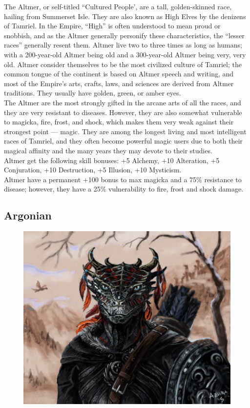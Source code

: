 \documentclass[12pt]{book}
\begin{document}
The Altmer, or self-titled ``Cultured People', are a tall, golden-skinned race, hailing from Summerset Isle. They are also known as High Elves by the denizens of Tamriel. In the Empire, ``High'' is often understood to mean proud or snobbish, and as the Altmer generally personify these characteristics, the ``lesser races'' generally resent them. Altmer live two to three times as long as humans; with a 200-year-old Altmer being old and a 300-year-old Altmer being very, very old. Altmer consider themselves to be the most civilized culture of Tamriel; the common tongue of the continent is based on Altmer speech and writing, and most of the Empire's arts, crafts, laws, and sciences are derived from Altmer traditions. They usually have golden, green, or amber eyes.\\

The Altmer are the most strongly gifted in the arcane arts of all the races, and they are very resistant to diseases. However, they are also somewhat vulnerable to magicka, fire, frost, and shock, which makes them very weak against their strongest point --- magic. They are among the longest living and most intelligent races of Tamriel, and they often become powerful magic users due to both their magical affinity and the many years they may devote to their studies.\\

Altmer get the following skill bonuses: +5 Alchemy, +10 Alteration, +5 Conjuration, +10 Destruction, +5 Illusion, +10 Mysticism.\\

Altmer have a permanent +100 bonus to max magicka and a 75\% resistance to disease; however, they have a 25\% vulnerability to fire, frost and shock damage.

\subsection{Argonian}
\begin{figure}
	\includegraphics[width=\textwidth]{Argonian.png}
\end{figure}
\end{document}
